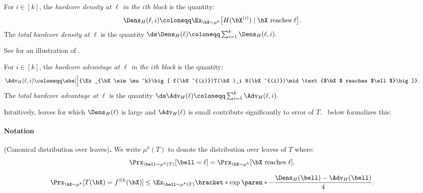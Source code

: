 \begin{definition}
\label{def:hardcore-density}
For $i\in [k]$, the {\sl hardcore density at $\ell$ in the $i$th block} is the quantity: 
\[ \Dens_H(\ell,i)\coloneqq \Ex_{\bX\sim \mu^k}\big[H(\bX^{(i)})\mid \text{$\bX$ reaches $\ell$}\big]. \]
The {\sl total hardcore density at $\ell$} is the quantity $\ds \Dens_H(\ell) \coloneqq \sum_{i =1}^k \Dens_H(\ell,i).$
\end{definition}

See  for an illustration of .





\begin{definition}
\label{def:hardcore advantage}
For $i\in [k]$, the {\sl hardcore advantage at $\ell$ in the $i$th block} is the quantity:
\[ \Adv_H(\ell,i) \coloneqq \abs[\Big]{\Ex_{\bX\sim \mu^k}\big[ f(\bX^{(i)})T(\bX)_i H(\bX^{(i)})\mid \text{$\bX$ reaches $\ell$}\big]}.  \]
The {\sl total hardcore advantage at $\ell$} is the quantity  
$ \ds \Adv_H(\ell) \coloneqq \sum_{i=1}^k \Adv_H(\ell, i). $
\end{definition}




Intuitively, leaves for which $\Dens_H(\ell)$ is large and $\Adv_H(\ell)$ is small contribute significantly to error of $T$.~ below  formalizes this:

\paragraph{Notation} \hspace{-10pt} (Canonical distribution over leaves){\bf .}   We write $\mu^k(T)$ to denote the distribution over leaves of $T$ where:  
\[ \Prx_{\bell\sim \mu^k(T)}[\bell = \ell] = \Prx_{\bX\sim \mu^k}[\text{$\bX$ reaches $\ell$}].\]


\begin{tcolorbox}[colback = white,arc=1mm, boxrule=0.25mm]
\begin{lemma}%
\label{lem:accuracy in terms of hardcore density and advantage}
\[ 
         \Prx_{\bX \sim \mu^k}[T(\bX) = f^{\otimes k}(\bX)] \leq \Ex_{\bell \sim \mu^k(T)}\bracket*{\exp\paren*{-\frac{\Dens_H(\bell) - \Adv_H(\bell)}{4}}}.
  \] 
\end{lemma} 
\end{tcolorbox}




